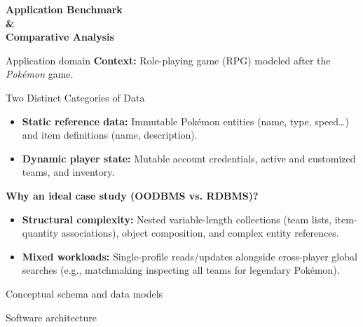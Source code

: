 \documentclass{beamer}
\begin{document}
\begin{frame}
    \vfill
    \begin{center}
        {\LARGE \textbf{Application Benchmark \\ \& \\
        \vspace{0.2em} Comparative Analysis}}\\[0.8em]
    \end{center}
    \vfill
\end{frame}

\begin{frame}{Application domain}
    \textbf{Context:} Role-playing game (RPG) modeled after the \textit{Pokémon} game.
    \vspace{0.4em}

    \begin{block}{Two Distinct Categories of Data}
        \begin{itemize}
            \item \textbf{Static reference data:} Immutable Pokémon entities (name, type, speed\dots) and item definitions (name, description).
            \item \textbf{Dynamic player state:} Mutable account credentials, active and customized teams, and inventory.
        \end{itemize}
    \end{block}

    \vspace{0.4em}
    \textbf{Why an ideal case study (OODBMS vs. RDBMS)?}
    \begin{itemize}
        \item \textbf{Structural complexity:} Nested variable-length collections (team lists, item-quantity associations), object composition, and complex entity references.
        \item \textbf{Mixed workloads:} Single-profile reads/updates alongside cross-player global searches (e.g., matchmaking inspecting all teams for legendary Pokémon).
    \end{itemize}
\end{frame}

\begin{frame}{Conceptual schema and data models}
\end{frame}

\begin{frame}{Software architecture}
\end{frame}
\end{document}
